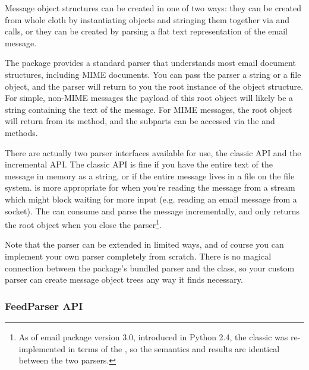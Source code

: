 
Message object structures can be created in one of two ways: they can be
created from whole cloth by instantiating  objects and
stringing them together via  and
 calls, or they can be created by parsing a flat text
representation of the email message.

The  package provides a standard parser that understands
most email document structures, including MIME documents.  You can
pass the parser a string or a file object, and the parser will return
to you the root  instance of the object structure.  For
simple, non-MIME messages the payload of this root object will likely
be a string containing the text of the message.  For MIME
messages, the root object will return  from its
 method, and the subparts can be accessed via
the  and  methods.

There are actually two parser interfaces available for use, the classic
 API and the incremental  API.  The classic
 API is fine if you have the entire text of the message in
memory as a string, or if the entire message lives in a file on the file
system.   is more appropriate for when you're reading the
message from a stream which might block waiting for more input (e.g. reading
an email message from a socket).  The  can consume and parse
the message incrementally, and only returns the root object when you close the
parser\footnote{As of email package version 3.0, introduced in
Python 2.4, the classic  was re-implemented in terms of the
, so the semantics and results are identical between the two
parsers.}.

Note that the parser can be extended in limited ways, and of course
you can implement your own parser completely from scratch.  There is
no magical connection between the  package's bundled
parser and the  class, so your custom parser can create
message object trees any way it finds necessary.

\subsubsection{FeedParser API}

